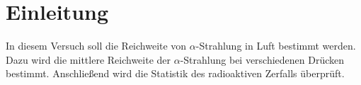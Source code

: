 
\section{Einleitung}
In diesem Versuch soll die Reichweite von $\alpha$-Strahlung in Luft
bestimmt werden. Dazu wird die mittlere Reichweite der
$\alpha$-Strahlung bei verschiedenen Drücken bestimmt. Anschließend wird
die Statistik des radioaktiven Zerfalls überprüft.
